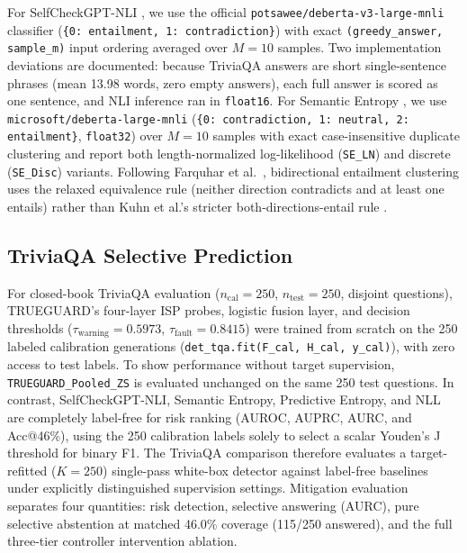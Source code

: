 \documentclass{ieeeaccess}
\begin{document}
For SelfCheckGPT-NLI \cite{review21}, we use the official \texttt{potsawee/\allowbreak deberta-v3-large-mnli} classifier (\texttt{\{0: entailment, 1: contradiction\}}) with exact \texttt{(greedy\_answer, sample\_m)} input ordering averaged over $M = 10$ samples. Two implementation deviations are documented: because TriviaQA answers are short single-sentence phrases (mean 13.98 words, zero empty answers), each full answer is scored as one sentence, and NLI inference ran in \texttt{float16}. For Semantic Entropy \cite{kuhn2023semantic,farquhar2024detecting}, we use \texttt{microsoft/\allowbreak deberta-large-mnli} (\texttt{\{0: contradiction, 1: neutral, 2: entailment\}}, \texttt{float32}) over $M = 10$ samples with exact case-insensitive duplicate clustering and report both length-normalized log-likelihood (\texttt{SE\_LN}) and discrete (\texttt{SE\_Disc}) variants. Following Farquhar et al.\ \cite{farquhar2024detecting}, bidirectional entailment clustering uses the relaxed equivalence rule (neither direction contradicts and at least one entails) rather than Kuhn et al.'s stricter both-directions-entail rule \cite{kuhn2023semantic}.

\subsection{TriviaQA Selective Prediction}
For closed-book TriviaQA evaluation ($n_{\text{cal}} = 250$, $n_{\text{test}} = 250$, disjoint questions), TRUEGUARD's four-layer ISP probes, logistic fusion layer, and decision thresholds ($\tau_{\text{warning}} = 0.5973$, $\tau_{\text{fault}} = 0.8415$) were trained from scratch on the 250 labeled calibration generations (\texttt{det\_tqa.fit(F\_cal, H\_cal, y\_cal)}), with zero access to test labels. To show performance without target supervision, \texttt{TRUEGUARD\_Pooled\_ZS} is evaluated unchanged on the same 250 test questions. In contrast, SelfCheckGPT-NLI, Semantic Entropy, Predictive Entropy, and NLL are completely label-free for risk ranking (AUROC, AUPRC, AURC, and Acc@46\%), using the 250 calibration labels solely to select a scalar Youden's J threshold for binary F1. The TriviaQA comparison therefore evaluates a target-refitted ($K = 250$) single-pass white-box detector against label-free baselines under explicitly distinguished supervision settings. Mitigation evaluation separates four quantities: risk detection, selective answering (AURC), pure selective abstention at matched 46.0\% coverage (115/250 answered), and the full three-tier controller intervention ablation.
\end{document}
